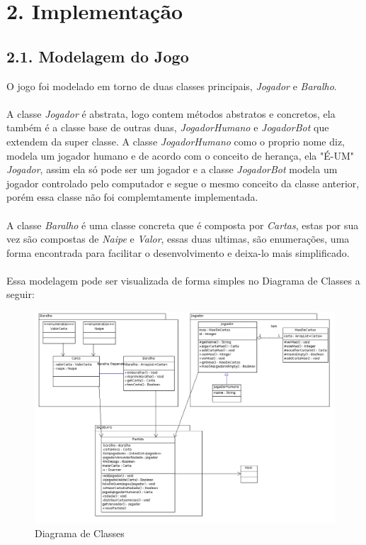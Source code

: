 \documentclass[12pt, a4paper]{article}
\begin{document}
\section*{2. Implementação}
  \subsection*{2.1. Modelagem do Jogo}
  O jogo foi modelado em torno de duas classes principais, \textit{Jogador} e \textit{Baralho}.
  \\\\
  A classe \textit{Jogador} é abstrata, logo contem métodos abstratos e concretos, ela também é a classe base de outras duas, \textit{JogadorHumano} e \textit{JogadorBot} que extendem da super classe. A classe \textit{JogadorHumano} como o proprio nome diz, modela um jogador humano e de acordo com o conceito de herança, ela "É-UM" \textit{Jogador}, assim ela só pode ser um jogador  e a classe \textit{JogadorBot} modela um jogador controlado pelo computador e segue o mesmo conceito da classe anterior, porém essa classe não foi complemtamente implementada.\\\\
  A classe \textit{Baralho} é uma classe concreta que é composta por \textit{Cartas}, estas por sua vez são compostas de \textit{Naipe} e \textit{Valor}, essas duas ultimas, são enumerações, uma forma encontrada para facilitar o desenvolvimento e deixa-lo mais simplificado.
  \\\\
  Essa modelagem pode ser visualizada de forma simples no Diagrama de Classes a seguir:

  \begin{figure}[!htb]
   \centering
   \includegraphics[scale=0.4]{../DiagramadeClassesBurro}
   \caption{Diagrama de Classes}
   \label{Rotulo}
  \end{figure}
\end{document}
